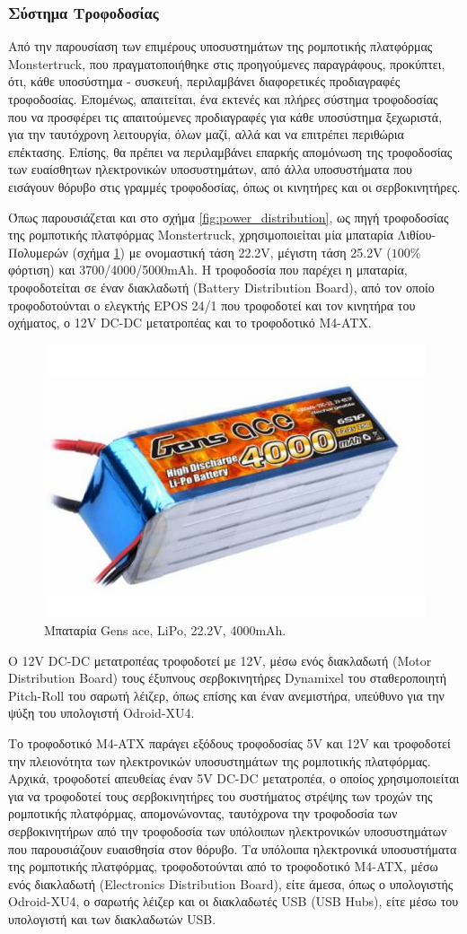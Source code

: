 \bigskip
\subsubsection{Σύστημα Τροφοδοσίας} \label{sssec:power_supply}
Από την παρουσίαση των επιμέρους υποσυστημάτων της ρομποτικής πλατφόρμας {Monstertruck}, που πραγματοποιήθηκε στις προηγούμενες παραγράφους, προκύπτει, ότι, κάθε υποσύστημα - συσκευή, περιλαμβάνει διαφορετικές προδιαγραφές τροφοδοσίας. Επομένως, απαιτείται, ένα εκτενές και πλήρες σύστημα τροφοδοσίας που να προσφέρει τις απαιτούμενες προδιαγραφές για κάθε υποσύστημα ξεχωριστά, για την ταυτόχρονη λειτουργία, όλων μαζί, αλλά και να επιτρέπει περιθώρια επέκτασης. Επίσης, θα πρέπει να περιλαμβάνει επαρκής απομόνωση της τροφοδοσίας των ευαίσθητων ηλεκτρονικών υποσυστημάτων, από άλλα υποσυστήματα που εισάγουν θόρυβο στις γραμμές τροφοδοσίας, όπως οι κινητήρες και οι σερβοκινητήρες. 

\bigskip
Όπως παρουσιάζεται και στο σχήμα \ref{fig:power_distribution}, ως πηγή τροφοδοσίας της ρομποτικής πλατφόρμας {Monstertruck}, χρησιμοποιείται μία μπαταρία {Λιθίου-Πολυμερών} (σχήμα \ref{fig:battery}) με ονομαστική τάση 22.2V, μέγιστη τάση 25.2V ($100\%$ φόρτιση) και 3700/4000/5000mAh. Η τροφοδοσία που παρέχει η μπαταρία, τροφοδοτείται σε έναν {διακλαδωτή (Battery Distribution Board)}, από τον οποίο τροφοδοτούνται ο ελεγκτής {EPOS 24/1} που τροφοδοτεί και τον κινητήρα του οχήματος, ο {12V DC-DC μετατροπέας} και το {τροφοδοτικό M4-ATX}.

\begin{figure}[!ht]
	\centering
	\includegraphics[width=0.25\linewidth]{Chapters/Chapter2/Figures/battery.jpg}
	\caption{Μπαταρία Gens ace, LiPo, 22.2V, 4000mAh.}
	\label{fig:battery}
\end{figure}

\bigskip
Ο {12V DC-DC μετατροπέας} τροφοδοτεί με 12V, μέσω ενός {διακλαδωτή (Motor Distribution Board)} τους {έξυπνους σερβοκινητήρες Dynamixel} του {σταθεροποιητή Pitch-Roll} του {σαρωτή λέιζερ}, όπως επίσης και έναν ανεμιστήρα, υπεύθυνο για την ψύξη του υπολογιστή {Odroid-XU4}.

\bigskip
Το τροφοδοτικό {M4-ATX} παράγει εξόδους τροφοδοσίας 5V και 12V και τροφοδοτεί την πλειονότητα των ηλεκτρονικών υποσυστημάτων της ρομποτικής πλατφόρμας. Αρχικά, τροφοδοτεί απευθείας έναν {5V DC-DC μετατροπέα}, ο οποίος χρησιμοποιείται για να τροφοδοτεί τους σερβοκινητήρες του συστήματος στρέψης των τροχών της ρομποτικής πλατφόρμας, απομονώνοντας, ταυτόχρονα την τροφοδοσία των σερβοκινητήρων από την τροφοδοσία των υπόλοιπων ηλεκτρονικών υποσυστημάτων που παρουσιάζουν ευαισθησία στον θόρυβο. Τα υπόλοιπα ηλεκτρονικά υποσυστήματα της ρομποτικής πλατφόρμας, τροφοδοτούνται από το τροφοδοτικό {M4-ATX}, μέσω ενός {διακλαδωτή (Electronics Distribution Board)}, είτε άμεσα, όπως ο υπολογιστής {Odroid-XU4}, ο {σαρωτής λέιζερ} και οι {διακλαδωτές USB (USB Hubs)}, είτε μέσω του υπολογιστή και των {διακλαδωτών USB}.

